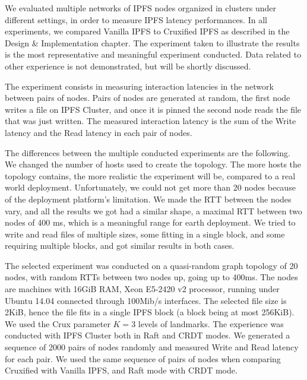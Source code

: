 \documentclass[a4paper,11pt,oneside]{report}
\begin{document}
We evaluated multiple networks of IPFS nodes organized in clusters under different settings, in order to measure IPFS latency performances. In all experiments, we compared Vanilla IPFS to Cruxified IPFS as described in the Design \& Implementation chapter. The experiment taken to illustrate the results is the most representative and meaningful experiment conducted. Data related to other experience is not demonstrated, but will be shortly discussed.

The experiment consists in measuring interaction latencies in the network between pairs of nodes. Pairs of nodes are generated at random, the first node writes a file on IPFS Cluster, and once it is pinned the second node reads the file that was just written. The measured interaction latency is the sum of the Write latency and the Read latency in each pair of nodes.

The differences between the multiple conducted experiments are the following. We changed the number of hosts used to create the topology. The more hosts the topology contains, the more realistic the experiment will be, compared to a real world deployment. Unfortunately, we could not get more than 20 nodes because of the deployment platform's limitation. We made the RTT between the nodes vary, and all the results we got had a similar shape, a maximal RTT between two nodes of 400 ms, which is a meaningful range for earth deployment. We tried to write and read files of multiple sizes, some fitting in a single block, and some requiring multiple blocks, and got similar results in both cases.

The selected experiment was conducted on a quasi-random graph topology of 20 nodes, with random RTTs between two nodes up, going up to 400ms. The nodes are machines with 16GiB RAM, Xeon E5-2420 v2 processor, running under Ubuntu 14.04 connected through 100Mib/s interfaces. The selected file size is 2KiB, hence the file fits in a single IPFS block (a block being at most 256KiB). We used the Crux parameter $K=3$ levels of landmarks. The experience was conducted with IPFS Cluster both in Raft and CRDT modes. We generated a sequence of 2000 pairs of nodes randomly and measured Write and Read latency for each pair. We used the same sequence of pairs of nodes when comparing Cruxified with Vanilla IPFS, and Raft mode with CRDT mode.
\end{document}
